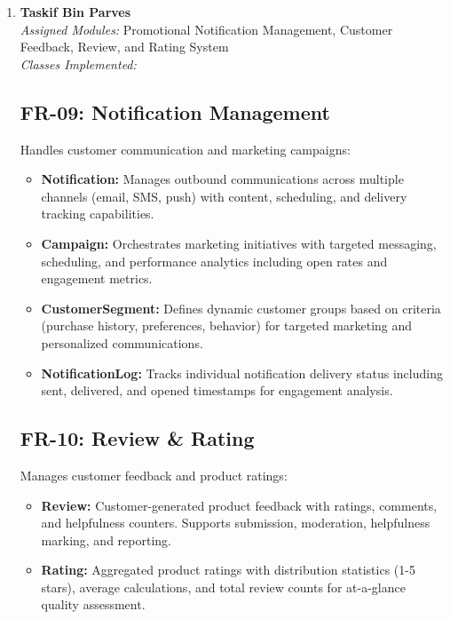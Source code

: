 \begin{enumerate}
\begin{itemize}
    \item \textbf{KPI:} Real-time key performance indicator tracking with current/previous values, percentage changes, and target setting for performance monitoring.
\end{itemize}

\item \textbf{Taskif Bin Parves} \\
\textit{Assigned Modules:} Promotional Notification Management, Customer Feedback, Review, and Rating System \\
\textit{Classes Implemented:}
\subsection*{FR-09: Notification Management}
Handles customer communication and marketing campaigns:

\begin{itemize}
    \item \textbf{Notification:} Manages outbound communications across multiple channels (email, SMS, push) with content, scheduling, and delivery tracking capabilities.
    
    \item \textbf{Campaign:} Orchestrates marketing initiatives with targeted messaging, scheduling, and performance analytics including open rates and engagement metrics.
    
    \item \textbf{CustomerSegment:} Defines dynamic customer groups based on criteria (purchase history, preferences, behavior) for targeted marketing and personalized communications.
    
    \item \textbf{NotificationLog:} Tracks individual notification delivery status including sent, delivered, and opened timestamps for engagement analysis.
\end{itemize}
\subsection*{FR-10: Review \& Rating}
Manages customer feedback and product ratings:

\begin{itemize}
    \item \textbf{Review:} Customer-generated product feedback with ratings, comments, and helpfulness counters. Supports submission, moderation, helpfulness marking, and reporting.
    
    \item \textbf{Rating:} Aggregated product ratings with distribution statistics (1-5 stars), average calculations, and total review counts for at-a-glance quality assessment.
    

\end{itemize}
\end{enumerate}
